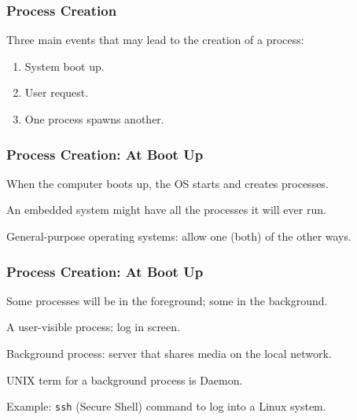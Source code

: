 \begin{frame}
	\frametitle{Process Creation}

	Three main events that may lead to the creation of a process:

	\begin{enumerate}
		\item System boot up.
		\item User request.
		\item One process spawns another.
	\end{enumerate}


\end{frame}

\begin{frame}
	\frametitle{Process Creation: At Boot Up}

	When the computer boots up, the OS starts and creates processes.

	An embedded system might have all the processes it will ever run.

	General-purpose operating systems: allow one (both) of the other ways.


\end{frame}

\begin{frame}
	\frametitle{Process Creation: At Boot Up}

	Some processes will be in the foreground; some in the background.

	A user-visible process: log in screen.

	Background process: server that shares media on the local network.

	UNIX term for a background process is \alert{Daemon}.

	Example: \texttt{ssh} (Secure Shell) command to log into a Linux system.


\end{frame}

